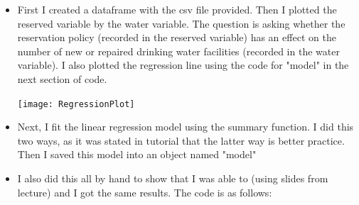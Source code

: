 \documentclass[12pt,letterpaper]{article}
\begin{document}
\begin{enumerate}
		\begin{itemize}
			\item First I created a dataframe with the csv file provided. Then I plotted the reserved variable by the water variable. The question is asking whether the reservation policy (recorded in the reserved variable) has an effect on the number of new or repaired drinking water facilities (recorded in the water variable). I also plotted the regression line using the code for "model" in the next section of code.
				
				
				\texttt{[image: RegressionPlot]}\hfill
			\item Next, I fit the linear regression model using the summary function. I did this two ways, as it was stated in tutorial that the latter way is better practice. Then I saved this model into an object named "model"
				
				
				
			\item I also did this all by hand to show that I was able to (using slides from lecture) and I got the same results. The code is as follows: 
				
		\end{itemize}
			

\end{enumerate}
\end{document}

